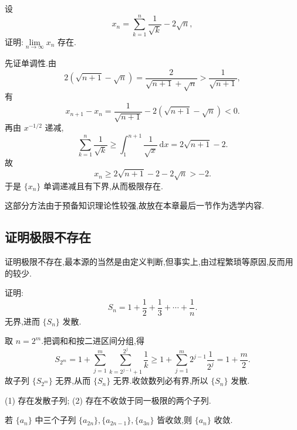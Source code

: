 \begin{example}
  设
  \[
    x_n=\sum\limits_{k=1}^n\dfrac{1}{\sqrt{k}}-2\sqrt{n},
  \]
  证明:$\displaystyle \lim\limits_{n\to\infty}x_n$ 存在.
\end{example}
\exampleblank

\begin{solution}
  先证单调性.由
  \[
    2(\sqrt{n+1}-\sqrt n)
    =\dfrac{2}{\sqrt{n+1}+\sqrt n}
    >\dfrac{1}{\sqrt{n+1}},
  \]
  有
  \[
    x_{n+1}-x_n
    =\dfrac{1}{\sqrt{n+1}}-2(\sqrt{n+1}-\sqrt n)<0.
  \]
  再由 $x^{-1/2}$ 递减,
  \[
    \sum\limits_{k=1}^n\dfrac{1}{\sqrt k}
    \geq\int_1^{n+1}\dfrac{1}{\sqrt x}\,\mathrm{d}x
    =2\sqrt{n+1}-2.
  \]
  故
  \[
    x_n\geq2\sqrt{n+1}-2-2\sqrt n>-2.
  \]
  于是 $\{x_n\}$ 单调递减且有下界,从而极限存在.
\end{solution}




这部分方法由于预备知识理论性较强,故放在本章最后一节作为选学内容.



\subsection{证明极限不存在}

证明极限不存在,最本源的当然是由定义判断,但事实上,由过程繁琐等原因,反而用的较少.




\begin{example}
  证明:
  \[
    S_n=1+\dfrac{1}{2}+\dfrac{1}{3}+\cdots+\dfrac{1}{n}.
  \]
  无界,进而 $\{S_n\}$ 发散.
\end{example}
\exampleblank

\begin{solution}
  取 $n=2^m$.把调和和按二进区间分组,得
  \[
    S_{2^m}
    =1+\sum\limits_{j=1}^m
    \sum\limits_{k=2^{j-1}+1}^{2^j}\dfrac{1}{k}
    \geq1+\sum\limits_{j=1}^m2^{j-1}\dfrac{1}{2^j}
    =1+\dfrac{m}{2}.
  \]
  故子列 $\{S_{2^m}\}$ 无界,从而 $\{S_n\}$ 无界.收敛数列必有界,所以
  $\{S_n\}$ 发散.
\end{solution}




(1) 存在发散子列;
(2) 存在不收敛于同一极限的两个子列.

\begin{example}
  若 $\{a_n\}$ 中三个子列 $\{a_{2n}\},\{a_{2n-1}\},\{a_{3n}\}$ 皆收敛,则 $\{a_n\}$ 收敛.
\end{example}
\exampleblank

